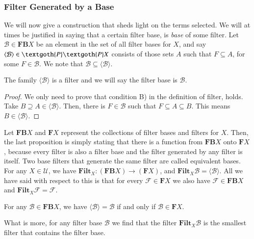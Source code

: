 \documentclass [12pt]{book}
\begin{document}
		\subsubsection{Filter Generated by a Base}

We will now give a construction that sheds light on the terms selected. We will at times be justified in saying that a certain filter base, is \textit{base} of some filter. Let $\mathcal{B}\in\textbf{FB}X$ be an element in the set of all filter bases for $X$, and say $\langle\mathcal{B}\rangle\in\textgoth{P}\textgoth{P} X$ consists of those sets $A$ such that $F\subseteq A$, for some $F\in\mathcal{B}$. We note that $\mathcal{B}\subseteq\langle\mathcal{B}\rangle$.

\begin{proposition}The family $\langle\mathcal{B}\rangle$ is a filter and we will say the filter base is $\mathcal{B}$.\end{proposition}

\begin{proof}We only need to prove that condition B) in the definition of filter, holds. Take $B\supseteq A\in\langle\mathcal{B}\rangle$. Then, there is $F\in\mathcal{B}$ such that $F\subseteq A\subseteq B$. This means $B\in\langle\mathcal{B}\rangle$.\end{proof}

Let $\textbf{FB}X$ and $\textbf{F}X$ represent the collections of filter bases and filters for $X$. Then, the last proposition is simply stating that there is a function from $\textbf{FB}X$ onto $\textbf{F}X$, because every filter is also a filter base and the filter generated by any filter is itself. Two base filters that generate the same filter are called equivalent bases. For any $X\in\mathcal{U}$, we have $\textbf{Filt}_X:(\textbf{FB}X)\rightarrow(\textbf{F}X)$, and $\textbf{Filt}_X\mathcal{B}=\langle\mathcal{B}\rangle$. All we have said with respect to this is that for every $\mathcal{F}\in\textbf{F}X$ we also have $\mathcal{F}\in\textbf{FB}X$ and $\textbf{Filt}_X\mathcal{F}=\mathcal{F}$.

\begin{proposition}For any $\mathcal{B}\in\textbf{FB}X$, we have $\langle\mathcal{B}\rangle=\mathcal{B}$ if and only if $\mathcal{B}\in\textbf{F}X$.\end{proposition}

What is more, for any filter base $\mathcal{B}$ we find that the filter $\textbf{Filt}_X\mathcal{B}$ is the smallest filter that contains the filter base.
\end{document}
